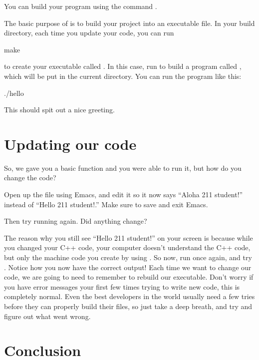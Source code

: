 \documentclass{tufte-handout}
\begin{document}
You can build your program using the command .

The basic purpose of  is to build your project into an
executable file. In your build directory, each time you update your
code, you can run

\begin{CmdLine}
  \prompt make 
\end{CmdLine}

\noindent to create your executable called .  In
this case, run  to build a program called
, which will be put in the current directory. You can
run the program like this:

\begin{CmdLine}
  \prompt ./hello
\end{CmdLine}

\noindent
This should spit out a nice greeting.

\section{Updating our code}

So, we gave you a basic function and you were able to run it, but how do
you change the code?

Open up the  file using Emacs, and edit it so it
now says ``Aloha 211 student!'' instead of ``Hello 211 student!.'' Make
sure to save and exit Emacs.

Then try running  again. Did anything change?

The reason why you still see ``Hello 211 student!'' on your screen is
because while you changed your C++ code, your computer doesn't
understand the C++ code, but only the machine code you create by using
.  So now, run  once again, and
try . Notice how you now have the correct output!
Each time we want to change our code, we are going to need to remember
to rebuild our executable. Don't worry if you have error messages your
first few times trying to write new code, this is completely normal.
Even the best developers in the world usually need a few tries before
they can properly build their files, so just take a deep breath, and try
and figure out what went wrong.

\section{Conclusion}
\end{document}
